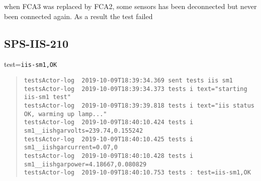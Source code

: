 \noindent when FCA3 was replaced by FCA2, some sensors has been deconnected but never been connected again. As a result the test failed

\subsection{SPS-IIS-210}
\label{sec:tc-210}

test=\texttt{iis-sm1,OK}

\begin{quote}
\begin{tiny}
\begin{verbatim}
testsActor-log  2019-10-09T18:39:34.369 sent tests iis sm1
testsActor-log  2019-10-09T18:39:34.373 tests i text="starting iis-sm1 test"
testsActor-log  2019-10-09T18:39:39.818 tests i text="iis status OK, warming up lamp..."
testsActor-log  2019-10-09T18:40:10.424 tests i sm1__iishgarvolts=239.74,0.155242
testsActor-log  2019-10-09T18:40:10.425 tests i sm1__iishgarcurrent=0.07,0
testsActor-log  2019-10-09T18:40:10.428 tests i sm1__iishgarpower=4.18667,0.080829
testsActor-log  2019-10-09T18:40:10.753 tests : test=iis-sm1,OK
\end{verbatim}
\end{tiny}
\end{quote}
